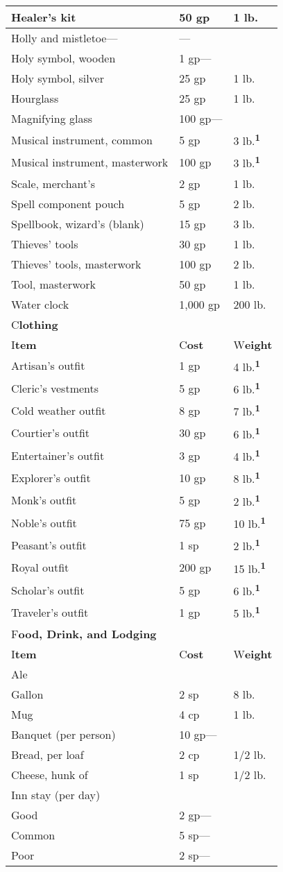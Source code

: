 \documentclass{article}
\begin{document}
\begin{tabular}{|>{\raggedright}p{182pt}|>{\raggedright}p{44pt}|>{\raggedright}p{40pt}|}
\hline
Healer's kit & 50 gp & 1 lb.\tabularnewline
\hline
Holly and mistletoe--- & --- & \tabularnewline
\hline
Holy symbol, wooden & 1 gp--- & \tabularnewline
\hline
Holy symbol, silver & 25 gp & 1 lb.\tabularnewline
\hline
Hourglass & 25 gp & 1 lb.\tabularnewline
\hline
Magnifying glass & 100 gp--- & \tabularnewline
\hline
Musical instrument, common & 5 gp & 3 lb.\textsuperscript{\textbf{1}}\tabularnewline
\hline
Musical instrument, masterwork & 100 gp & 3 lb.\textsuperscript{\textbf{1}}\tabularnewline
\hline
Scale, merchant's & 2 gp & 1 lb.\tabularnewline
\hline
Spell component pouch & 5 gp & 2 lb.\tabularnewline
\hline
Spellbook, wizard's (blank) & 15 gp & 3 lb.\tabularnewline
\hline
Thieves' tools & 30 gp & 1 lb.\tabularnewline
\hline
Thieves' tools, masterwork & 100 gp & 2 lb.\tabularnewline
\hline
Tool, masterwork & 50 gp & 1 lb.\tabularnewline
\hline
Water clock & 1,000 gp & 200 lb.\tabularnewline
\hline
C\textbf{lothing} &  & \tabularnewline
\hline
I\textbf{tem} & C\textbf{ost} & W\textbf{eight}\tabularnewline
\hline
Artisan's outfit & 1 gp & 4 lb.\textsuperscript{\textbf{1}}\tabularnewline
\hline
Cleric's vestments & 5 gp & 6 lb.\textsuperscript{\textbf{1}}\tabularnewline
\hline
Cold weather outfit & 8 gp & 7 lb.\textsuperscript{\textbf{1}}\tabularnewline
\hline
Courtier's outfit & 30 gp & 6 lb.\textsuperscript{\textbf{1}}\tabularnewline
\hline
Entertainer's outfit & 3 gp & 4 lb.\textsuperscript{\textbf{1}}\tabularnewline
\hline
Explorer's outfit & 10 gp & 8 lb.\textsuperscript{\textbf{1}}\tabularnewline
\hline
Monk's outfit & 5 gp & 2 lb.\textsuperscript{\textbf{1}}\tabularnewline
\hline
Noble's outfit & 75 gp & 10 lb.\textsuperscript{\textbf{1}}\tabularnewline
\hline
Peasant's outfit & 1 sp & 2 lb.\textsuperscript{\textbf{1}}\tabularnewline
\hline
Royal outfit & 200 gp & 15 lb.\textsuperscript{\textbf{1}}\tabularnewline
\hline
Scholar's outfit & 5 gp & 6 lb.\textsuperscript{\textbf{1}}\tabularnewline
\hline
Traveler's outfit & 1 gp & 5 lb.\textsuperscript{\textbf{1}}\tabularnewline
\hline
F\textbf{ood, Drink, and Lodging} &  & \tabularnewline
\hline
I\textbf{tem} & C\textbf{ost} & W\textbf{eight}\tabularnewline
\hline
Ale &  & \tabularnewline
\hline
Gallon & 2 sp & 8 lb.\tabularnewline
\hline
Mug & 4 cp & 1 lb.\tabularnewline
\hline
Banquet (per person) & 10 gp--- & \tabularnewline
\hline
Bread, per loaf & 2 cp & 1/2 lb.\tabularnewline
\hline
Cheese, hunk of & 1 sp & 1/2 lb.\tabularnewline
\hline
Inn stay (per day) &  & \tabularnewline
\hline
Good & 2 gp--- & \tabularnewline
\hline
Common & 5 sp--- & \tabularnewline
\hline
Poor & 2 sp--- & \tabularnewline

\end{tabular}
\end{document}
